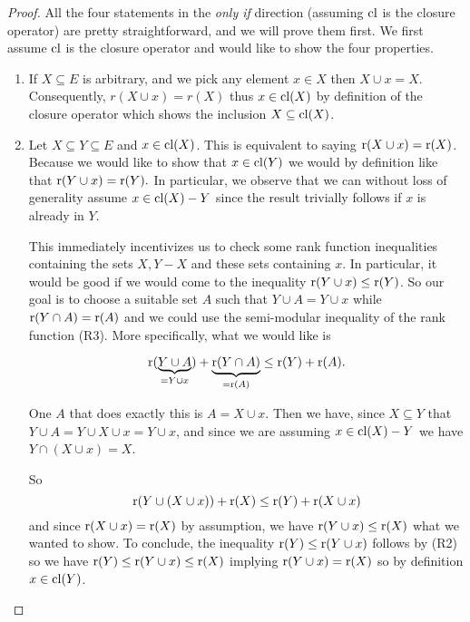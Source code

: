 \begin{proof}
    All the four statements in the \textit{only if} direction (assuming $\mathrm{cl}$ is the closure operator) are pretty straightforward, and we will prove them first. We first assume $\mathrm{cl}$ is the closure operator and would like to show the four properties.

    \begin{enumerate}
        \item If $X\subseteq E$ is arbitrary, and we pick any element $x \in X$ then $X \cup x = X$. Consequently, $r(X \cup x)= r(X)$ thus $x \in \mathrm{cl}(X)$ by definition of the closure operator which shows the inclusion $X \subseteq \mathrm{cl}(X)$.

        \item Let $X \subseteq Y \subseteq E$
        and $x \in \mathrm{cl}(X)$. This is equivalent to saying $\operatorname{r}(X \cup x) = \operatorname{r}(X)$. Because we would like to show that $x \in \mathrm{cl}(Y)$ we would by definition like that $\operatorname{r}(Y \cup x) = \operatorname{r}(Y).$ In particular, we observe that we can without loss of generality assume $x \in \mathrm{cl}(X) - Y$ since the result trivially follows if $x$ is already in $Y$. 
        
        This immediately incentivizes us to check some rank function inequalities containing the sets $X, Y - X$ and these sets containing $x.$ In particular, it would be good if we would come to the inequality 
        $\operatorname{r}(Y\cup x) \leq \operatorname{r}(Y)$.
        So our goal is to choose a suitable set $A$ such that $Y \cup A = Y \cup x$ while $\operatorname{r}(Y \cap A) = \operatorname{r}(A)$ and we could use the semi-modular inequality of the rank function (R3). More specifically, what we would like is

        $$\operatorname{r}(\underbrace{Y \cup A}_{ = Y  \cup x}) + \underbrace{\operatorname{r}(Y \cap A)}_{ = \operatorname{r}(A)} \leq \operatorname{r}(Y) + \operatorname{r}(A).$$

        One $A$ that does exactly this is $A = X \cup x.$ Then we have, since $X \subseteq Y$ that $Y \cup A = Y \cup X \cup x = Y \cup x$, and since we are assuming $x \in \mathrm{cl}(X) - Y$ we have $Y \cap (X \cup x) = X $.

        So $$\operatorname{r}(Y\cup (X \cup x)) + \operatorname{r}(X) \leq \operatorname{r}(Y) + \operatorname{r}(X \cup x)$$ and since $\operatorname{r}(X \cup x) = \operatorname{r}(X)$ by assumption, we have 
        $\operatorname{r}(Y \cup x)\leq \operatorname{r}(X)$ what we wanted to show. To conclude, the inequality $\operatorname{r}(Y) \leq \operatorname{r}(Y \cup x)$ follows by (R2) so we have $\operatorname{r}(Y) \leq \operatorname{r}(Y\cup x) \leq \operatorname{r}(X)$ implying $\operatorname{r}(Y \cup x ) = \operatorname{r}(X)$ so by definition $x \in \mathrm{cl}(Y)$.


\end{enumerate}
\end{proof}
